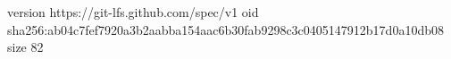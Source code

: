 version https://git-lfs.github.com/spec/v1
oid sha256:ab04c7fef7920a3b2aabba154aac6b30fab9298c3c0405147912b17d0a10db08
size 82
